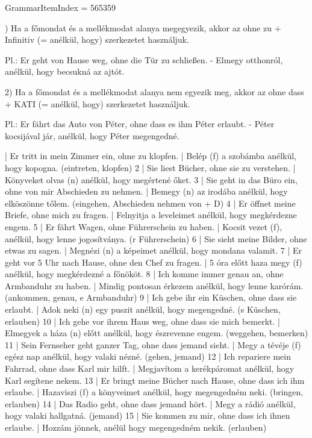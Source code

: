 \documentclass{article}
\newenvironment{desc}{\verbatim}{\endverbatim}
\newenvironment{exmp}{\verbatim}{\endverbatim}
\begin{document}
GrammarItemIndex = 565359

\begin{desc}
1) Ha a főmondat és a mellékmodat alanya megegyezik, akkor az ohne zu + Infinitiv (= anélkül, hogy) szerkezetet használjuk.

Pl.: Er geht von Hause weg, ohne die Tür zu schließen. - Elmegy otthonról, anélkül, hogy becsukná az ajtót.

2) Ha a főmondat és a mellékmodat alanya nem egyezik meg, akkor az ohne dass + KATI (= anélkül, hogy) szerkezetet használjuk.

Pl.: Er fährt das Auto von Péter, ohne dass es ihm Péter erlaubt. - Péter kocsijával jár, anélkül, hogy Péter megengedné.
\end{desc}

\begin{exmp}
1 | Er tritt in mein Zimmer ein, ohne zu klopfen. | Belép (f) a szobámba anélkül, hogy kopogna. (eintreten, klopfen)
2 | Sie liest Bücher, ohne sie zu verstehen. | Könyveket olvas (n) anélkül, hogy megértené őket.
3 | Sie geht in das Büro ein, ohne von mir Abschieden zu nehmen. | Bemegy (n) az irodába anélkül, hogy elköszönne tőlem. (eingehen, Abschieden nehmen von + D)
4 | Er öffnet meine Briefe, ohne mich zu fragen. | Felnyitja a leveleimet anélkül, hogy megkérdezne engem.
5 | Er fährt Wagen, ohne Führerschein zu haben. | Kocsit vezet (f), anélkül, hogy lenne jogosítványa. (r Führerschein)
6 | Sie sieht meine Bilder, ohne etwas zu sagen. | Megnézi (n) a képeimet anélkül, hogy mondana valamit.
7 | Er geht vor 5 Uhr nach Hause, ohne den Chef zu fragen. | 5 óra előtt haza megy (f) anélkül, hogy megkérdezné a főnököt.
8 | Ich komme immer genau an, ohne Armbanduhr zu haben. | Mindig pontosan érkezem anélkül, hogy lenne karórám. (ankommen, genau, e Armbanduhr)
9 | Ich gebe ihr ein Küschen, ohne dass sie erlaubt. | Adok neki (n) egy puszit anélkül, hogy megengedné. (s Küschen, erlauben)
10 | Ich gehe vor ihrem Haus weg, ohne dass sie mich bemerkt. | Elmegyek a háza (n) előtt anélkül, hogy észrevenne engem. (weggehen, bemerken)
11 | Sein Fernseher geht ganzer Tag, ohne dass jemand sieht. | Megy a tévéje (f) egész nap anélkül, hogy valaki nézné. (gehen, jemand)
12 | Ich repariere mein Fahrrad, ohne dass Karl mir hilft. | Megjavítom a kerékpáromat anélkül, hogy Karl segítene nekem.
13 | Er bringt meine Bücher nach Hause, ohne dass ich ihm erlaube. | Hazaviszi (f) a könyveimet anélkül, hogy megengedném neki. (bringen, erlauben)
14 | Das Radio geht, ohne dass jemand hört. | Megy a rádió anélkül, hogy valaki hallgatná. (jemand)
15 | Sie kommen zu mir, ohne dass ich ihnen erlaube. | Hozzám jönnek, anélül hogy megengedném nekik. (erlauben)
\end{exmp}
\end{document}
